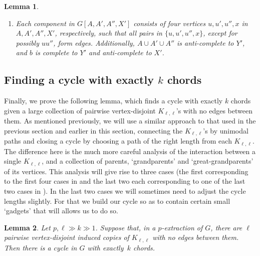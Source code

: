 \documentclass[10pt,a4paper]{amsart}
\theoremstyle{plain}
\newtheorem{lem}{Lemma}
\theoremstyle{definition}
\begin{document}
\begin{lem}
\begin{enumerate} [label = (K\arabic*)]
            \item \label{itm:f}
                Each component in $G[A, A', A'', X']$ consists of four vertices $u, u', u'', x$ in $A, A', A'', X'$, respectively, such that all pairs in $\{u, u', u'', x\}$, except for possibly $uu''$, form edges. Additionally, $A \cup A' \cup A''$ is anti-complete to $Y'$, and $b$ is complete to $Y'$ and anti-complete to $X'$.
                
        \end{enumerate}
    \end{lem}

    \subsection{Finding a cycle with exactly $k$ chords}
    
    Finally, we prove the following lemma, which finds a cycle with exactly $k$ chords given a large collection of pairwise vertex-disjoint $K_{\ell,\ell}$'s with no edges between them.
    As mentioned previously, we will use a similar approach to that used in the previous section and earlier in this section, connecting the $K_{\ell,\ell}$'s by unimodal paths and closing a cycle by choosing a path of the right length from each $K_{\ell,\ell}$. The difference here is the much more careful analysis of the interaction between a single $K_{\ell,\ell}$, and a collection of parents, `grandparents' and `great-grandparents' of its vertices. This analysis will give rise to three cases (the first corresponding to the first four cases in  and the last two each corresponding to one of the last two cases in ). In the last two cases we will sometimes need to adjust the cycle lengths slightly. For that we build our cycle so as to contain certain small `gadgets' that will allows us to do so.  

    \begin{lem} \label{lem:find-cycle-from-Kll-exact}
        Let $p, \ell \gg k \gg 1$. Suppose that, in a $p$-extraction of $G$, there are $\ell$ pairwise vertex-disjoint induced copies of $K_{\ell, \ell}$ with no edges between them. Then there is a cycle in $G$ with exactly~$k$ chords.
    \end{lem}
\end{document}
